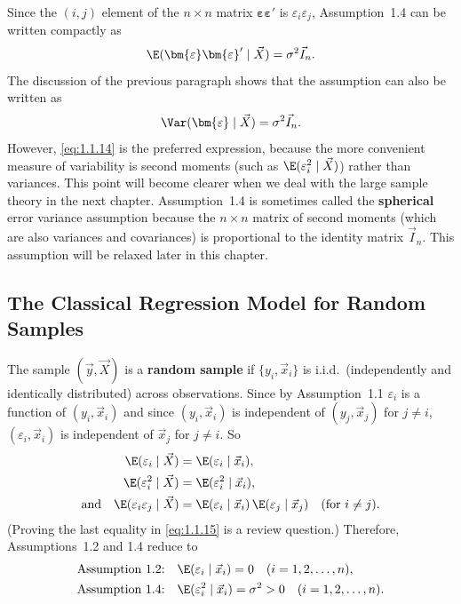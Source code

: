 
Since the $(i, j)$ element of the $n \times n$ matrix
$\bm{\varepsilon}\bm{\varepsilon}'$ is $\varepsilon_i \varepsilon_j$,
Assumption~1.4 can be written compactly as
\begin{equation}\label{eq:1.1.14}
  \E(\bm{\varepsilon}\bm{\varepsilon}' \mid \vec{X})
    = \sigma^{2} \vec{I}_{n}.
\end{equation}
The discussion of the previous paragraph shows that the assumption can also be
written as
\[
  \Var(\bm{\varepsilon} \mid \vec{X}) = \sigma^{2} \vec{I}_{n}.
\]
However, \eqref{eq:1.1.14} is the preferred expression, because the more
convenient measure of variability is second moments (such as
$\E(\varepsilon_i^{2} \mid \vec{X})$) rather than variances.  This point will
become clearer when we deal with the large sample theory in the next chapter.
Assumption~1.4 is sometimes called the \textbf{spherical} error variance
assumption because the $n \times n$ matrix of second moments (which are also
variances and covariances) is proportional to the identity matrix
$\vec{I}_{n}$.  This assumption will be relaxed later in this chapter.

\subsection*{The Classical Regression Model for Random Samples}

The sample $(\vec{y}, \vec{X})$ is a \textbf{random sample} if
$\{y_i, \vec{x}_i\}$ is i.i.d.\ (independently and identically distributed)
across observations.  Since by Assumption~1.1 $\varepsilon_i$ is a function of
$(y_i, \vec{x}_i)$ and since $(y_i, \vec{x}_i)$ is independent of
$(y_j, \vec{x}_j)$ for $j \neq i$,
$(\varepsilon_i, \vec{x}_i)$ is independent of $\vec{x}_j$ for $j \neq i$.
So
\begin{align}
  \E(\varepsilon_i \mid \vec{X})
    &= \E(\varepsilon_i \mid \vec{x}_i), \notag \\
  \E(\varepsilon_i^{2} \mid \vec{X})
    &= \E(\varepsilon_i^{2} \mid \vec{x}_i), \notag \\
  \text{and}\quad
  \E(\varepsilon_i \varepsilon_j \mid \vec{X})
    &= \E(\varepsilon_i \mid \vec{x}_i)\,
       \E(\varepsilon_j \mid \vec{x}_j)
       \quad (\text{for } i \neq j).
  \label{eq:1.1.15}
\end{align}
(Proving the last equality in \eqref{eq:1.1.15} is a review question.)
Therefore, Assumptions~1.2 and 1.4 reduce to
\begin{align}
  \text{Assumption 1.2:}\quad
    & \E(\varepsilon_i \mid \vec{x}_i) = 0
      \quad (i = 1, 2, \ldots, n),
    \label{eq:1.1.16} \\
  \text{Assumption 1.4:}\quad
    & \E(\varepsilon_i^{2} \mid \vec{x}_i) = \sigma^{2} > 0
      \quad (i = 1, 2, \ldots, n).
    \label{eq:1.1.17}
\end{align}

